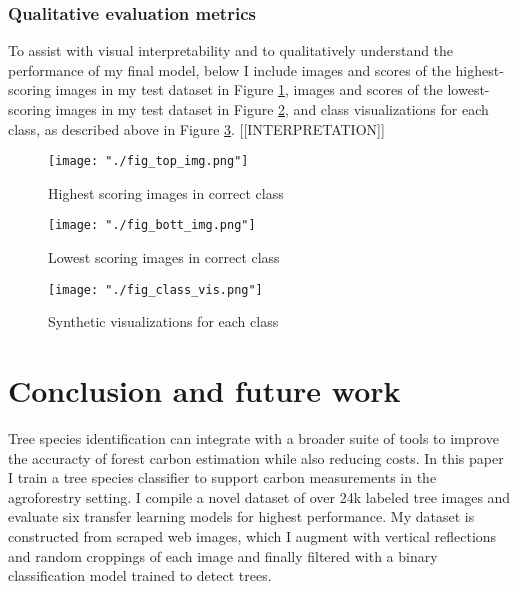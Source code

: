 \documentclass[10pt,twocolumn,letterpaper]{article}
\begin{document}
\subsubsection{Qualitative evaluation metrics}
To assist with visual interpretability and to qualitatively understand the performance of my final model, below I include images and scores of the highest-scoring images in my test dataset in Figure \ref{fig:top_imgs}, images and scores of the lowest-scoring images in my test dataset in Figure \ref{fig:bott_imgs}, and class visualizations for each class, as described above in Figure \ref{fig:class_vis}.
[[INTERPRETATION]]

\begin{figure}[!htbp]
  \centering
  \texttt{[image: "./fig\_top\_img.png"]}
  \caption{\label{fig:top_imgs} Highest scoring images in correct class}
\end{figure}

\begin{figure}[!htbp]
  \centering
  \texttt{[image: "./fig\_bott\_img.png"]}
  \caption{\label{fig:bott_imgs} Lowest scoring images in correct class}
\end{figure}

\begin{figure}[!htbp]
  \centering
  \texttt{[image: "./fig\_class\_vis.png"]}
  \caption{\label{fig:class_vis} Synthetic visualizations for each class}
\end{figure}







\section{Conclusion and future work}
\label{sec:conclusion}
Tree species identification can integrate with a broader suite of tools to improve the accuracty of forest carbon estimation while also reducing costs. In this paper I train a tree species classifier to support carbon measurements in the agroforestry setting. I compile a novel dataset of over 24k labeled tree images and evaluate six transfer learning models for highest performance. My dataset is constructed from scraped web images, which I augment with vertical reflections and random croppings of each image and finally filtered with a binary classification model trained to detect trees.
  
\end{document}
